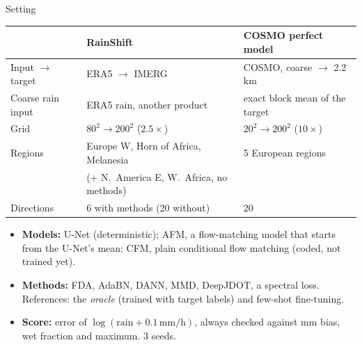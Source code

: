 \documentclass[11pt,aspectratio=169,xcolor=table]{beamer}
\begin{document}
\begin{frame}{Setting}
\small
\begin{tabular}{@{}lll@{}}
\toprule
 & \textbf{RainShift} & \textbf{COSMO perfect model} \\
\midrule
Input $\to$ target & ERA5 $\to$ IMERG & COSMO, coarse $\to$ 2.2\,km \\
Coarse rain input & ERA5 rain, another product & exact block mean of the target \\
Grid & $80^2 \to 200^2$ ($2.5\times$) & $20^2 \to 200^2$ ($10\times$) \\
Regions & Europe W, Horn of Africa, Melanesia & 5 European regions \\
 & (+ N.\ America E, W.\ Africa, no methods) & \\
Directions & 6 with methods (20 without) & 20 \\
\bottomrule
\end{tabular}

\medskip
\begin{itemize}
  \item \textbf{Models:} U-Net (deterministic); AFM, a flow-matching model
        that starts from the U-Net's mean; CFM, plain conditional flow
        matching (coded, not trained yet).
  \item \textbf{Methods:} FDA, AdaBN, DANN, MMD, DeepJDOT, a spectral loss.
        References: the \emph{oracle} (trained with target labels) and
        few-shot fine-tuning.
  \item \textbf{Score:} error of $\log(\text{rain} + 0.1\,\text{mm/h})$,
        always checked against mm bias, wet fraction and maximum. 3 seeds.
\end{itemize}
\end{frame}
\end{document}

